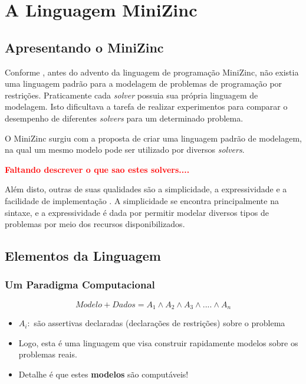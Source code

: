 \chapter{A Linguagem MiniZinc}


\section{Apresentando o MiniZinc}
\label{sc:minizinc}

Conforme \cite{mzntwds}, antes do advento da linguagem de programação MiniZinc, não existia uma linguagem padrão para a modelagem de problemas de programação por restrições. Praticamente cada \textit{solver} possuia sua própria linguagem de modelagem. Isto dificultava a tarefa de realizar experimentos para comparar o desempenho de diferentes \textit{solvers} para um determinado problema.

O MiniZinc surgiu com a proposta de criar uma linguagem padrão de modelagem, na qual um mesmo modelo pode ser utilizado por diversos \textit{solvers}. 

{\bf \textcolor{red}{Faltando descrever o que sao estes solvers....}}


Além disto, outras de suas qualidades são a simplicidade, a expressividade e a facilidade de implementação \cite{mzntwds}. A simplicidade se encontra principalmente na sintaxe, e a expressividade é dada por permitir modelar diversos tipos de problemas por meio dos recursos disponibilizados.

\section{Elementos da Linguagem}


\subsection{Um Paradigma Computacional}

$$ Modelo + Dados = A_1 \wedge A_2 \wedge A_3 \wedge  ....  \wedge  A_n $$

\begin{itemize}
  \item 
 $A_i: $ são assertivas declaradas (declarações de restrições) sobre o problema

  \item  Logo, esta é uma linguagem  que visa construir rapidamente
modelos sobre os problemas reais.

  \item  Detalhe é que estes \textbf{modelos} são computáveis!


\end{itemize}




